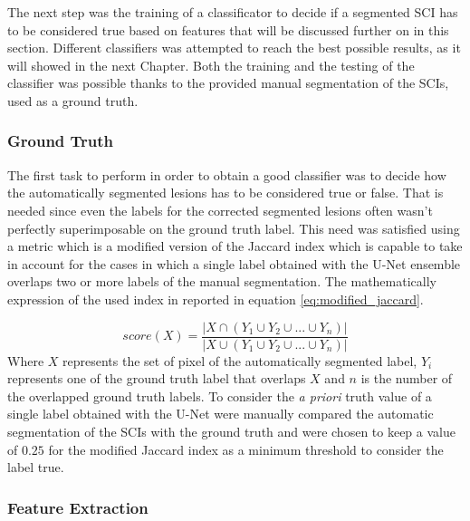 \documentclass{standalone}
\begin{document}
The next step was the training of a classificator to decide if a segmented SCI has to be considered true based on features that will be discussed further on in this section.
Different classifiers was attempted to reach the best possible results, as it will showed in the next Chapter.
Both the training and the testing of the classifier was possible thanks to the provided manual segmentation of the SCIs, used as a ground truth.

\subsubsection{Ground Truth}
The first task to perform in order to obtain a good classifier was to decide how the automatically segmented lesions has to be considered true or false. That is needed since even the labels for the corrected segmented lesions often wasn't perfectly superimposable on the ground truth label.
This need was satisfied using a metric which is a modified version of the Jaccard index which is capable to take in account for the cases in which a single label obtained with the U-Net ensemble overlaps two or more labels of the manual segmentation.
The mathematically expression of the used index in reported in equation \ref{eq:modified_jaccard}.

\begin{equation} \label{eq:modified_jaccard}
    score(X) = \frac{|X \cap (Y_1 \cup Y_2 \cup ... \cup Y_n)|}
    {|X \cup (Y_1 \cup Y_2 \cup ... \cup Y_n)|}
\end{equation}
Where $X$ represents the set of pixel of the automatically segmented label, $Y_i$ represents one of the ground truth label that overlaps $X$ and $n$ is the number of the overlapped ground truth labels.
To consider the \textit{a priori} truth value of a single label obtained with the U-Net were manually compared the automatic segmentation of the SCIs with the ground truth and were chosen to keep a value of $0.25$ for the modified Jaccard index as a minimum threshold to consider the label true.

\subsubsection{Feature Extraction}
\end{document}
